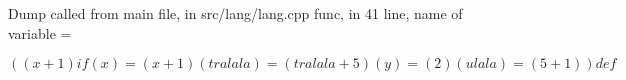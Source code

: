\documentclass{article}
\begin{document}
Dump called from main file, in src/lang/lang.cpp func, in 41 line, name of variable = 


$$
((x + 1) if (x) = (x + 1)(tralala) = (tralala + 5)(y) = (2)(ulala) = (5 + 1)) def 
$$
\end{document}
